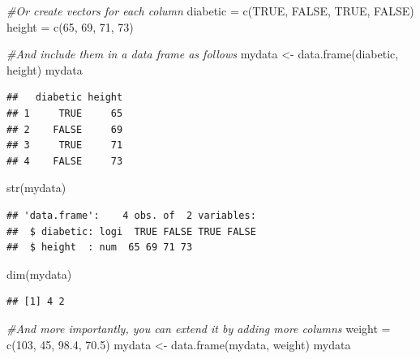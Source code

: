 \documentclass[
]{book}
\newenvironment{Shaded}{\begin{snugshade}}{\end{snugshade}}
\newcommand{\CommentTok}[1]{\textcolor[rgb]{0.56,0.35,0.01}{\textit{#1}}}
\newcommand{\ConstantTok}[1]{\textcolor[rgb]{0.00,0.00,0.00}{#1}}
\newcommand{\DecValTok}[1]{\textcolor[rgb]{0.00,0.00,0.81}{#1}}
\newcommand{\FloatTok}[1]{\textcolor[rgb]{0.00,0.00,0.81}{#1}}
\newcommand{\FunctionTok}[1]{\textcolor[rgb]{0.00,0.00,0.00}{#1}}
\newcommand{\NormalTok}[1]{#1}
\newcommand{\OtherTok}[1]{\textcolor[rgb]{0.56,0.35,0.01}{#1}}
\theoremstyle{definition}
\theoremstyle{definition}
\theoremstyle{definition}
\theoremstyle{definition}
\theoremstyle{remark}
\begin{document}
\begin{Shaded}
\begin{Highlighting}[]
\CommentTok{\#Or create vectors for each column}
\NormalTok{diabetic }\OtherTok{=} \FunctionTok{c}\NormalTok{(}\ConstantTok{TRUE}\NormalTok{, }\ConstantTok{FALSE}\NormalTok{, }\ConstantTok{TRUE}\NormalTok{, }\ConstantTok{FALSE}\NormalTok{)}
\NormalTok{height }\OtherTok{=} \FunctionTok{c}\NormalTok{(}\DecValTok{65}\NormalTok{, }\DecValTok{69}\NormalTok{, }\DecValTok{71}\NormalTok{, }\DecValTok{73}\NormalTok{)}

\CommentTok{\#And include them in a data frame as follows}
\NormalTok{mydata }\OtherTok{\textless{}{-}} \FunctionTok{data.frame}\NormalTok{(diabetic, height)}
\NormalTok{mydata}
\end{Highlighting}
\end{Shaded}

\begin{verbatim}
##   diabetic height
## 1     TRUE     65
## 2    FALSE     69
## 3     TRUE     71
## 4    FALSE     73
\end{verbatim}

\begin{Shaded}
\begin{Highlighting}[]
\FunctionTok{str}\NormalTok{(mydata)}
\end{Highlighting}
\end{Shaded}

\begin{verbatim}
## 'data.frame':    4 obs. of  2 variables:
##  $ diabetic: logi  TRUE FALSE TRUE FALSE
##  $ height  : num  65 69 71 73
\end{verbatim}

\begin{Shaded}
\begin{Highlighting}[]
\FunctionTok{dim}\NormalTok{(mydata)}
\end{Highlighting}
\end{Shaded}

\begin{verbatim}
## [1] 4 2
\end{verbatim}

\begin{Shaded}
\begin{Highlighting}[]
\CommentTok{\#And more importantly, you can extend it by adding more columns}
\NormalTok{weight }\OtherTok{=} \FunctionTok{c}\NormalTok{(}\DecValTok{103}\NormalTok{, }\DecValTok{45}\NormalTok{, }\FloatTok{98.4}\NormalTok{, }\FloatTok{70.5}\NormalTok{)}
\NormalTok{mydata }\OtherTok{\textless{}{-}} \FunctionTok{data.frame}\NormalTok{(mydata, weight)}
\NormalTok{mydata}
\end{Highlighting}
\end{Shaded}
\end{document}
